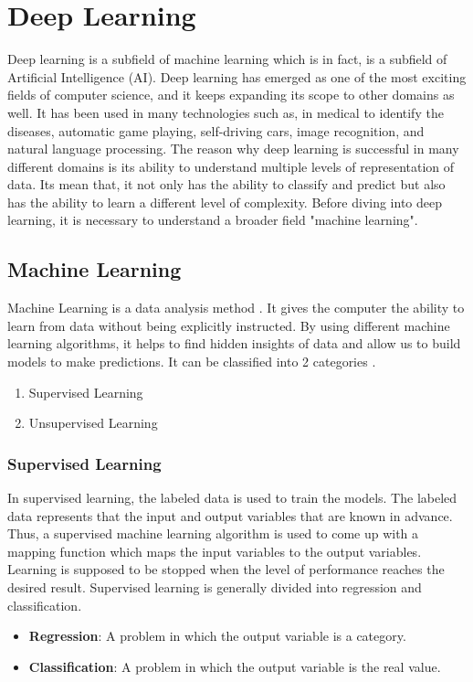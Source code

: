 \chapter{Deep Learning}

Deep learning is a subfield of machine learning which is in fact, is a subfield of Artificial Intelligence (AI). Deep learning has emerged as one of the most exciting fields of computer science, and it keeps expanding its scope to other domains as well. It has been used in many technologies such as, in medical to identify the diseases, automatic game playing, self-driving cars, image recognition, and natural language processing. The reason why deep learning is successful in many different domains is its ability to understand multiple levels of representation of data. Its mean that, it not only has the ability to classify and predict but also has the ability to learn a different level of complexity. Before diving into deep learning, it is necessary to understand a broader field "machine learning".

\section{Machine Learning}

Machine Learning is a data analysis method \cite{bishop2006pattern}. It gives the computer the ability to learn from data without being explicitly instructed. By using different machine learning algorithms, it helps to find hidden insights of data and allow us to build models to make predictions. It can be classified into 2 categories \cite{machinelearningmastery}.

\begin{enumerate}
	\item Supervised Learning
	\item Unsupervised Learning
\end{enumerate}

\subsection{Supervised Learning}

In supervised learning, the labeled data is used to train the models. The labeled data represents that the input and output variables that are known in advance. Thus, a supervised machine learning algorithm is used to come up with a mapping function which maps the input variables to the output variables. Learning is supposed to be stopped when the level of performance reaches the desired result. Supervised learning is generally divided into regression and classification.
\begin{itemize}
	\item \textbf{Regression}: A problem in which the output variable is a category.
	\item \textbf{Classification}: A problem in which the output variable is the real value.
\end{itemize}

